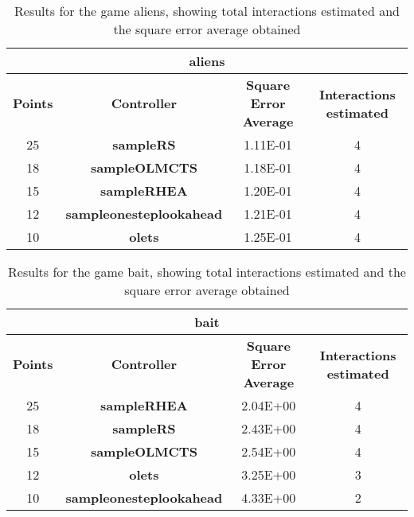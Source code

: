 \begin{table*}[!t]
\begin{center}
\begin{adjustbox}{width=1\textwidth}
\begin{tabular}{|c|c|c|c|}
\hline
\multicolumn{4}{|c|}{\textbf{aliens}}\\
\hline
\textbf{Points} & \textbf{Controller} & \textbf{Square Error Average} & \textbf{Interactions estimated}\\
\hline
25 & \textbf{sampleRS} & 1.11E-01 & 4
 \\
\hline
18 & \textbf{sampleOLMCTS} & 1.18E-01 & 4
 \\
\hline
15 & \textbf{sampleRHEA} & 1.20E-01 & 4
 \\
\hline
12 & \textbf{sampleonesteplookahead} & 1.21E-01 & 4
 \\
\hline
10 & \textbf{olets} & 1.25E-01 & 4
 \\
\hline
\end{tabular}
\end{adjustbox}
\caption{Results for the game aliens, showing total interactions estimated and the square error average obtained}
\label{tab:weights}
\end{center}
\end{table*}
\begin{table*}[!t]
\begin{center}
\begin{adjustbox}{width=1\textwidth}
\begin{tabular}{|c|c|c|c|}
\hline
\multicolumn{4}{|c|}{\textbf{bait}}\\
\hline
\textbf{Points} & \textbf{Controller} & \textbf{Square Error Average} & \textbf{Interactions estimated}\\
\hline
25 & \textbf{sampleRHEA} & 2.04E+00 & 4
 \\
\hline
18 & \textbf{sampleRS} & 2.43E+00 & 4
 \\
\hline
15 & \textbf{sampleOLMCTS} & 2.54E+00 & 4
 \\
\hline
12 & \textbf{olets} & 3.25E+00 & 3
 \\
\hline
10 & \textbf{sampleonesteplookahead} & 4.33E+00 & 2
 \\
\hline
\end{tabular}
\end{adjustbox}
\caption{Results for the game bait, showing total interactions estimated and the square error average obtained}
\label{tab:weights}
\end{center}
\end{table*}
